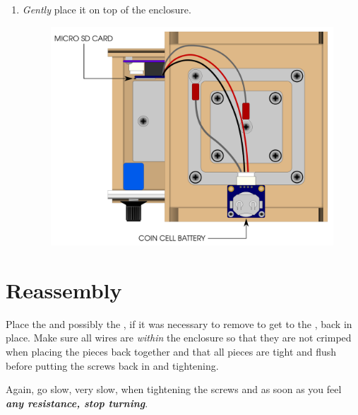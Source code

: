 {\begin{enumerate}
  \item \textit{Gently} place it on top of the enclosure.

  \begin{figure}[H]
  \centering
    \includegraphics{images/disassembly_04.png}
  \end{figure}

\end{enumerate}}

\section{Reassembly} \label{Reassembly}

Place the  and possibly the , if it was necessary to remove to
get to the , back in place.  Make sure all wires are \textit{within} the
enclosure so that they are not crimped when placing the pieces back together and
that all pieces are tight and flush before putting the screws back in and
tightening.

\par\medskip

Again, go slow, very slow, when tightening the screws and as soon as you feel
\textit{\bfseries any resistance, stop turning}.

